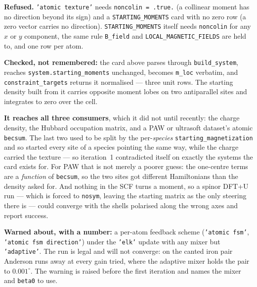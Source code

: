 \documentclass[11pt,a4paper]{article}
\newcommand{\code}[1]{\texttt{\small #1}}
\begin{document}
\begin{refuses}
\textbf{Refused.} \code{'atomic texture'} needs \code{noncolin = .true.} (a
collinear moment has no direction beyond its sign) and a
\code{STARTING\_MOMENTS} card with no zero row (a zero vector carries no
direction). \code{STARTING\_MOMENTS} itself needs \code{noncolin} for any $x$ or
$y$ component, the same rule \code{B\_field} and \code{LOCAL\_MAGNETIC\_FIELDS}
are held to, and one row per atom.

\textbf{Checked, not remembered:} the card above parses through
\code{build\_system}, reaches \code{system.starting\_moments} unchanged, becomes
\code{m\_loc} verbatim, and \code{constraint\_targets} returns it normalised ---
three unit rows. The starting density built from it carries opposite moment
lobes on two antiparallel sites and integrates to zero over the cell.

\textbf{It reaches all three consumers}, which it did not until recently: the
charge density, the Hubbard occupation matrix, and a PAW or ultrasoft dataset's
atomic \code{becsum}. The last two used to be split by the per-\emph{species}
\code{starting\_magnetization} and so started every site of a species pointing
the same way, while the charge carried the texture --- so iteration~1
contradicted itself on exactly the systems the card exists for. For PAW that is
not merely a poorer guess: the one-centre terms are a \emph{function} of
\code{becsum}, so the two sites got different Hamiltonians than the density
asked for. And nothing in the SCF turns a moment, so a spinor DFT+U run --- which
is forced to \code{nosym}, leaving the starting matrix as the only steering
there is --- could converge with the shells polarised along the wrong axes and
report success.

\textbf{Warned about, with a number:} a per-atom feedback scheme
(\code{'atomic fsm'}, \code{'atomic fsm direction'}) under the \code{'elk'}
update with any mixer but \code{'adaptive'}. The run is legal and will not
converge: on the canted iron pair Anderson runs away at every gain tried, where
the adaptive mixer holds the pair to $0.001^\circ$. The warning is raised before
the first iteration and names the mixer and \code{beta0} to use.


\end{refuses}
\end{document}
